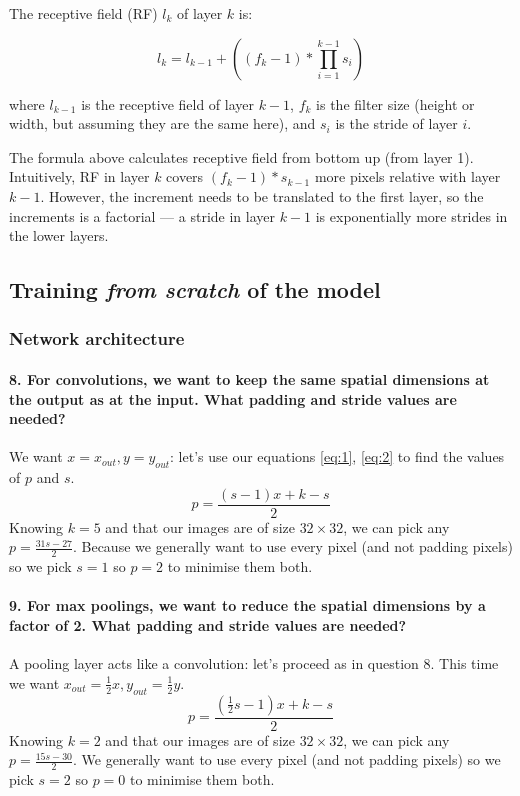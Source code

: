 \documentclass{article}
\theoremstyle{plain}%
\theoremstyle{definition}
\theoremstyle{remark}
\begin{document}
The receptive field (RF) $l_k$ of layer $k$ is:

$$ l_k = l_{k-1} + ((f_k - 1) * \prod_{i=1}^{k-1}s_i) $$

where $l_{k-1}$ is the receptive field of layer $k-1$, $f_k$ is the filter size (height or width, but assuming they are the same here), and $s_i$ is the stride of layer $i$.

The formula above calculates receptive field from bottom up (from layer 1). Intuitively, RF in layer $k$ covers $(f_k - 1) * s_{k-1}$ more pixels relative with layer $k-1$. However, the increment needs to be translated to the first layer, so the increments is a factorial --- a stride in layer $k-1$ is exponentially more strides in the lower layers.


\subsection{Training \textit{from scratch} of the model}
\subsubsection{Network architecture}
\paragraph{8. For convolutions, we want to keep the same spatial dimensions at the output as at the input. What padding and stride values are needed?}
We want $ x = x_{out}, y = y_{out} $: let's use our equations \ref{eq:1}, \ref{eq:2} to find the values of $p$ and $s$.
\[
    p = \frac{(s-1)x + k - s}{2}
\]
Knowing $k = 5$ and that our images are of size $32 \times 32 $, we can pick any $p = \frac{31s - 27}{2}$. Because we generally want to use every pixel (and not padding pixels) so we pick $ s = 1 $ so $ p = 2 $ to minimise them both.


\paragraph{9. For max poolings, we want to reduce the spatial dimensions by a factor of 2. What padding and stride values are needed?}
A pooling layer acts like a convolution: let's proceed as in question 8. This time we want $ x_{out} = \frac{1}{2}x, y_{out} = \frac{1}{2}y$.
\[
    p = \frac{(\frac{1}{2}s - 1) x + k - s}{2}
\]
Knowing $k = 2$ and that our images are of size $32 \times 32 $, we can pick any $p = \frac{15s - 30}{2}$. We generally want to use every pixel (and not padding pixels) so we pick $ s = 2 $ so $ p = 0 $ to minimise them both.
\end{document}
